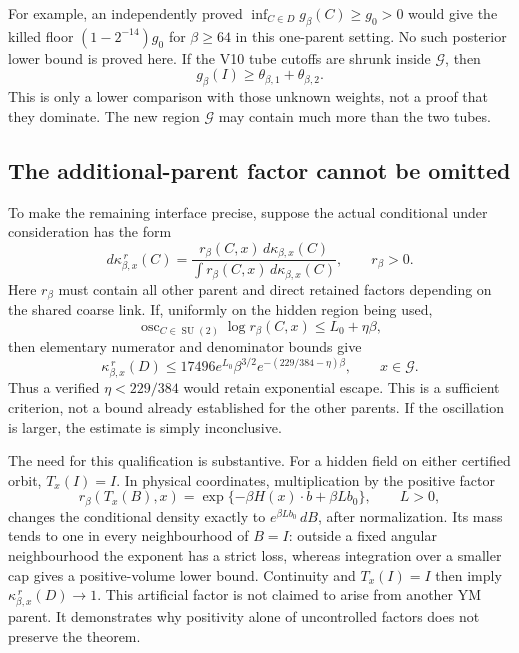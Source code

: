 \documentclass[11pt,oneside]{article}
\DeclareMathOperator{\SU}{SU}
\begin{document}
For example, an independently proved
\(\inf_{C\in D}g_\beta(C)\ge g_0>0\) would give
the killed floor \((1-2^{-14})g_0\) for
\(\beta\ge64\) in this one-parent setting. No such
posterior lower bound is proved here.
If the V10 tube cutoffs are shrunk inside
\(\mathcal G\), then
\[
 g_\beta(I)\ge\theta_{\beta,1}+\theta_{\beta,2}.
\]
This is only a lower comparison with those unknown
weights, not a proof that they dominate. The new
region \(\mathcal G\) may contain much more than
the two tubes.

\subsection{The additional-parent factor cannot be omitted}

To make the remaining interface precise, suppose
the actual conditional under consideration has
the form
\[
 d\kappa^{\,r}_{\beta,x}(C)=
   \frac{r_\beta(C,x)\,d\kappa_{\beta,x}(C)}
        {\int r_\beta(C,x)\,d\kappa_{\beta,x}(C)},
       \qquad r_\beta>0 .
\]
Here \(r_\beta\) must contain all other parent and
direct retained factors depending on the shared
coarse link. If, uniformly on the hidden region
being used,
\[
 \operatorname{osc}_{C\in\SU(2)}\log r_\beta(C,x)
                           \le L_0+\eta\beta ,
\]
then elementary numerator and denominator bounds
give
\begin{equation}\label{eq:f13v11-reweight}
 \kappa^{\,r}_{\beta,x}(D)
 \le17496e^{L_0}\beta^{3/2}
                  e^{-(229/384-\eta)\beta},
                    \qquad x\in\mathcal G .
\end{equation}
Thus a verified \(\eta<229/384\) would retain
exponential escape. This is a sufficient criterion,
not a bound already established for the other
parents. If the oscillation is larger, the estimate
is simply inconclusive.

The need for this qualification is substantive.
For a hidden field on either certified orbit,
\(T_x(I)=I\). In physical coordinates, multiplication
by the positive factor
\[
 r_\beta(T_x(B),x)
             =\exp\{-\beta H(x)\cdot b+\beta Lb_0\},
                         \qquad L>0,
\]
changes the conditional density exactly to
\(e^{\beta Lb_0}\,dB\), after normalization. Its
mass tends to one in every neighbourhood of \(B=I\):
outside a fixed angular neighbourhood the exponent
has a strict loss, whereas integration over a
smaller cap gives a positive-volume lower bound.
Continuity and \(T_x(I)=I\) then imply
\(\kappa^{\,r}_{\beta,x}(D)\to1\). This artificial
factor is not claimed to arise from another YM
parent. It demonstrates why positivity alone of
uncontrolled factors does not preserve the theorem.
\end{document}
